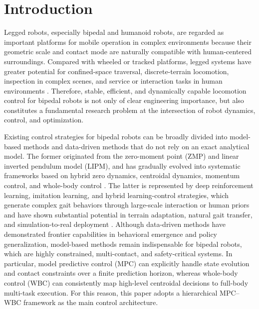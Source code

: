 \documentclass[5p,times]{elsarticle}
\begin{document}
\section{Introduction}
Legged robots, especially bipedal and humanoid robots, are regarded as important platforms for mobile operation in complex environments because their geometric scale and contact mode are naturally compatible with human-centered surroundings. Compared with wheeled or tracked platforms, legged systems have greater potential for confined-space traversal, discrete-terrain locomotion, inspection in complex scenes, and service or interaction tasks in human environments \cite{ref22,ref23,ref20,ref74,ref78}. Therefore, stable, efficient, and dynamically capable locomotion control for bipedal robots is not only of clear engineering importance, but also constitutes a fundamental research problem at the intersection of robot dynamics, control, and optimization.

Existing control strategies for bipedal robots can be broadly divided into model-based methods and data-driven methods that do not rely on an exact analytical model. The former originated from the zero-moment point (ZMP) and linear inverted pendulum model (LIPM), and has gradually evolved into systematic frameworks based on hybrid zero dynamics, centroidal dynamics, momentum control, and whole-body control \cite{ref12,ref17,ref18,ref14,ref16,ref25,ref36,ref55,ref63}. The latter is represented by deep reinforcement learning, imitation learning, and hybrid learning-control strategies, which generate complex gait behaviors through large-scale interaction or human priors and have shown substantial potential in terrain adaptation, natural gait transfer, and simulation-to-real deployment \cite{ref56,ref58,ref59,ref62}. Although data-driven methods have demonstrated frontier capabilities in behavioral emergence and policy generalization, model-based methods remain indispensable for bipedal robots, which are highly constrained, multi-contact, and safety-critical systems. In particular, model predictive control (MPC) can explicitly handle state evolution and contact constraints over a finite prediction horizon, whereas whole-body control (WBC) can consistently map high-level centroidal decisions to full-body multi-task execution. For this reason, this paper adopts a hierarchical MPC--WBC framework as the main control architecture.
\end{document}
